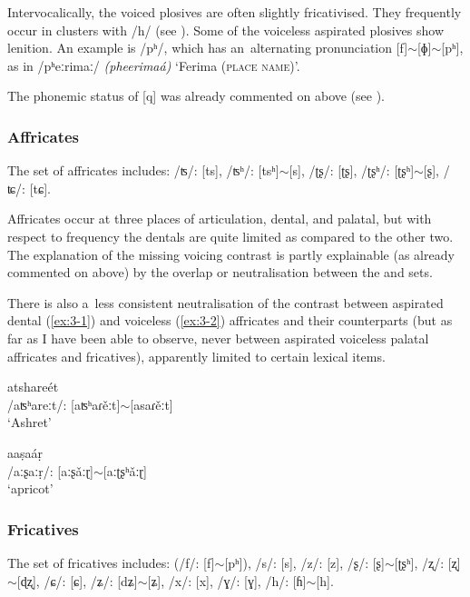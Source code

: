 Intervocalically, the voiced plosives are often slightly fricativised. They frequently occur in clusters with /h/ (see ). Some of the voiceless aspirated plosives show lenition. An example is /pʰ/, which has an~alternating pronunciation [f]$\sim$[ɸ]$\sim$[pʰ], as in /pʰeːrimaː/ \textit{(pheerimaá)} `Ferima (\textsc{place name)}'. 


The phonemic status of [q] was already commented on above (see ).


\subsubsection*{Affricates}

The set of affricates includes: /ʦ/: [ts], /ʦʰ/: [tsʰ]$\sim$[s], /ʈʂ/: [ʈʂ], /ʈʂʰ/: [ʈʂʰ]$\sim$[ʂ], /ʨ/: [tɕ].


Affricates occur at three places of articulation, dental,  and palatal, but with respect to frequency the dentals are quite limited as compared to the other two. The explanation of the missing voicing contrast is partly explainable (as already commented on above) by the overlap or neutralisation between the  and  sets. 


There is also a~less consistent neutralisation of the contrast between aspirated dental (\ref{ex:3-1}) and  voiceless (\ref{ex:3-2}) affricates and their  counterparts (but as far as I have been able to observe, never between aspirated voiceless palatal affricates and fricatives), apparently limited to certain lexical items. 

\begin{exe}
\ex
\label{ex:3-1}
\gll atshareét \\
 /aʦʰareːt/: [aʦʰaɾěːt]$\sim$[asaɾěːt] \\
\glt `Ashret'

\ex
\label{ex:3-2}
\gll aaṣaáṛ \\
/aːʂaːṛ/: [aːʂǎːɽ]$\sim$[aːʈʂʰǎːɽ] \\
\glt `apricot'
\end{exe}

\subsubsection*{Fricatives}

The set of fricatives includes: (/f/: [f]$\sim$[pʰ]), /s/: [s], /z/: [z], /ʂ/: [ʂ]$\sim$[ʈʂʰ], /ʐ/: [ʐ]$\sim$[ɖʐ], /ɕ/: [ɕ], /ʑ/: [dʑ]$\sim$[ʑ], /x/: [x], /ɣ/: [ɣ], /h/: [ɦ]$\sim$[h].


